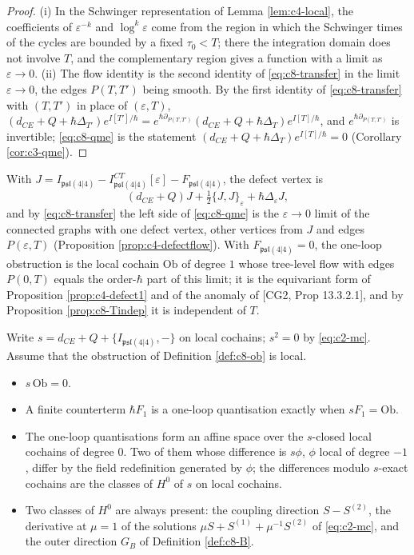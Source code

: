 \begin{proof}
(i) In the Schwinger representation of Lemma \ref{lem:c4-local}, the coefficients of $\varepsilon^{-k}$ and $\log^k\varepsilon$ come from the region in which the Schwinger times of the cycles are bounded by a fixed $\tau_0<T$; there the integration domain does not involve $T$, and the complementary region gives a function with a limit as $\varepsilon\to0$. (ii) The flow identity is the second identity of \eqref{eq:c8-transfer} in the limit $\varepsilon\to0$, the edges $P(T,T')$ being smooth. By the first identity of \eqref{eq:c8-transfer} with $(T,T')$ in place of $(\varepsilon,T)$, $(d_{CE}+Q+\hbar\Delta_{T'})e^{I[T']/\hbar}=e^{\hbar\partial_{P(T,T')}}(d_{CE}+Q+\hbar\Delta_T)e^{I[T]/\hbar}$, and $e^{\hbar\partial_{P(T,T')}}$ is invertible; \eqref{eq:c8-qme} is the statement $(d_{CE}+Q+\hbar\Delta_T)e^{I[T]/\hbar}=0$ (Corollary \ref{cor:c3-qme}).
\end{proof}

\begin{definition}
\label{def:c8-ob}
With $J=I_{\mathfrak{psl}(4|4)}-I^{CT}_{\mathfrak{psl}(4|4)}[\varepsilon]-F_{\mathfrak{psl}(4|4)}$, the defect vertex is
\[
(d_{CE}+Q)J+\tfrac12\{J,J\}_\varepsilon+\hbar\Delta_\varepsilon J ,
\]
and by \eqref{eq:c8-transfer} the left side of \eqref{eq:c8-qme} is the $\varepsilon\to0$ limit of the connected graphs with one defect vertex, other vertices from $J$ and edges $P(\varepsilon,T)$ (Proposition \ref{prop:c4-defectflow}). With $F_{\mathfrak{psl}(4|4)}=0$, the one-loop obstruction is the local cochain $\mathrm{Ob}$ of degree $1$ whose tree-level flow with edges $P(0,T)$ equals the order-$\hbar$ part of this limit; it is the equivariant form of Proposition \ref{prop:c4-defect1} and of the anomaly of [CG2, Prop 13.3.2.1], and by Proposition \ref{prop:c8-Tindep} it is independent of $T$.
\end{definition}

\begin{theorem}
\label{thm:c8-obstruction}
Write $s=d_{CE}+Q+\{I_{\mathfrak{psl}(4|4)},-\}$ on local cochains; $s^2=0$ by \eqref{eq:c2-mc}. Assume that the obstruction of Definition \ref{def:c8-ob} is local.
\begin{itemize}
\item[(i)] $s\,\mathrm{Ob}=0$.
\item[(ii)] A finite counterterm $\hbar F_1$ is a one-loop quantisation exactly when $sF_1=\mathrm{Ob}$.
\item[(iii)] The one-loop quantisations form an affine space over the $s$-closed local cochains of degree $0$. Two of them whose difference is $s\phi$, $\phi$ local of degree $-1$, differ by the field redefinition generated by $\phi$; the differences modulo $s$-exact cochains are the classes of $H^0$ of $s$ on local cochains.
\item[(iv)] Two classes of $H^0$ are always present: the coupling direction $S-S^{(2)}$, the derivative at $\mu=1$ of the solutions $\mu S+S^{(1)}+\mu^{-1}S^{(2)}$ of \eqref{eq:c2-mc}, and the outer direction $G_B$ of Definition \ref{def:c8-B}.
\end{itemize}
\end{theorem}

